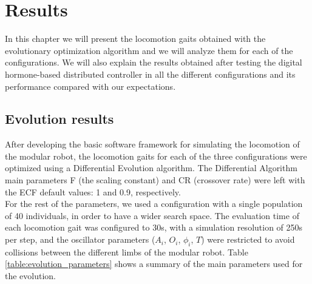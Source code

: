 \chapter{Results}
\label{results}

In this chapter we will present the locomotion gaits obtained with the evolutionary optimization algorithm and we will analyze them for each of the configurations. We will also explain the results obtained after testing the digital hormone-based distributed controller in all the different configurations and its performance compared with our expectations.\\

\section{Evolution results}
\label{results_evolution}

After developing the basic software framework for simulating the locomotion of the modular robot, the locomotion gaits for each of the three configurations were optimized using a Differential Evolution algorithm. The Differential Algorithm main parameters F (the scaling constant) and CR (crossover rate) were left with the ECF default values: 1 and 0.9, respectively.\\

For the rest of the parameters, we used a configuration with a single population of 40 individuals, in order to have a wider search space. The evaluation time of each locomotion gait was configured to 30s, with a simulation resolution of 250\micro s per step, and the oscillator parameters ($A_i$, $O_i$, $\phi_i$, $T$) were restricted to avoid collisions between the different limbs of the modular robot. Table \ref{table:evolution_parameters} shows a summary of the main parameters used for the evolution.\\

